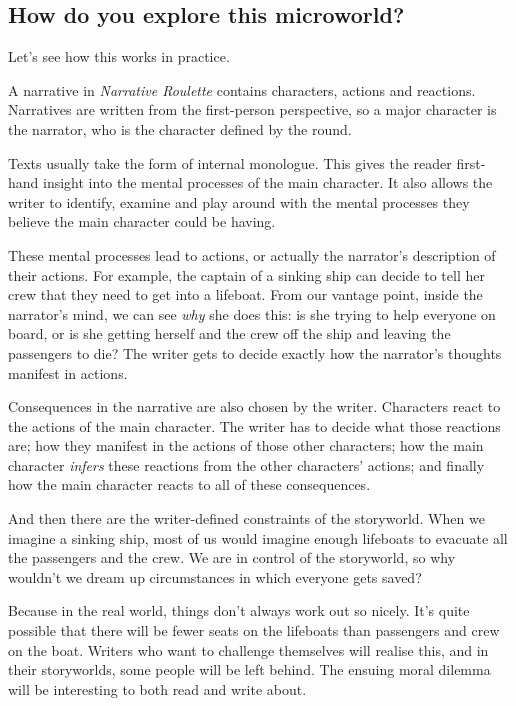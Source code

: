 \subsection{How do you explore this microworld?}

Let's see how this works in practice.

A narrative in \emph{Narrative Roulette} contains characters, actions
and reactions. Narratives are written from the first-person perspective,
so a major character is the narrator, who is the character defined by
the round.

Texts usually take the form of internal monologue. This gives the reader
first-hand insight into the mental processes of the main character. It
also allows the writer to identify, examine and play around with the
mental processes they believe the main character could be having.

These mental processes lead to actions, or actually the narrator's
description of their actions. For example, the captain of a sinking ship
can decide to tell her crew that they need to get into a lifeboat. From
our vantage point, inside the narrator's mind, we can see \emph{why} she
does this: is she trying to help everyone on board, or is she getting
herself and the crew off the ship and leaving the passengers to die? The
writer gets to decide exactly how the narrator's thoughts manifest in
actions.

Consequences in the narrative are also chosen by the writer. Characters
react to the actions of the main character. The writer has to decide
what those reactions are; how they manifest in the actions of those
other characters; how the main character \emph{infers} these reactions
from the other characters' actions; and finally how the main character
reacts to all of these consequences.

And then there are the writer-defined constraints of the storyworld.
When we imagine a sinking ship, most of us would imagine enough
lifeboats to evacuate all the passengers and the crew. We are in control
of the storyworld, so why wouldn't we dream up circumstances in which
everyone gets saved?

Because in the real world, things don't always work out so nicely. It's
quite possible that there will be fewer seats on the lifeboats than
passengers and crew on the boat. Writers who want to challenge
themselves will realise this, and in their storyworlds, some people will
be left behind. The ensuing moral dilemma will be interesting to both
read and write about.

